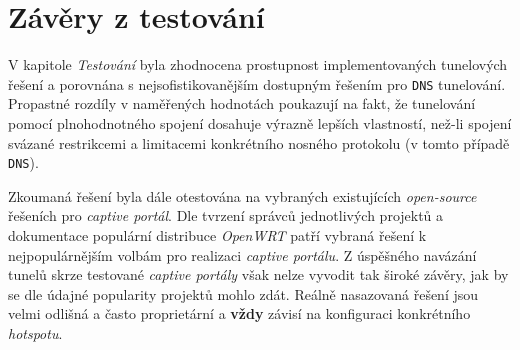 \documentclass[thesis=M,czech]{FITthesis}[2012/10/20]
\begin{document}
\section{Závěry z testování}

V kapitole \textit{Testování} byla zhodnocena prostupnost implementovaných tunelových řešení a porovnána s nejsofistikovanějším dostupným řešením pro \texttt{DNS} tunelování. Propastné rozdíly v naměřených hodnotách poukazují na fakt, že tunelování pomocí plnohodnotného spojení dosahuje výrazně lepších vlastností, než-li spojení svázané restrikcemi a limitacemi konkrétního nosného protokolu (v tomto případě \texttt{DNS}).

Zkoumaná řešení byla dále otestována na vybraných existujících \textit{open-source} řešeních pro \textit{captive portál}. Dle tvrzení správců jednotlivých projektů a dokumentace populární distribuce \textit{OpenWRT} patří vybraná řešení k nejpopulárnějším volbám pro realizaci \textit{captive portálu}. Z úspěšného navázání tunelů skrze testované \textit{captive portály} však nelze vyvodit tak široké závěry, jak by se dle údajné popularity projektů mohlo zdát. Reálně nasazovaná řešení jsou velmi odlišná a často proprietární a \textbf{vždy} závisí na konfiguraci konkrétního \textit{hotspotu}.

     
\end{document}
